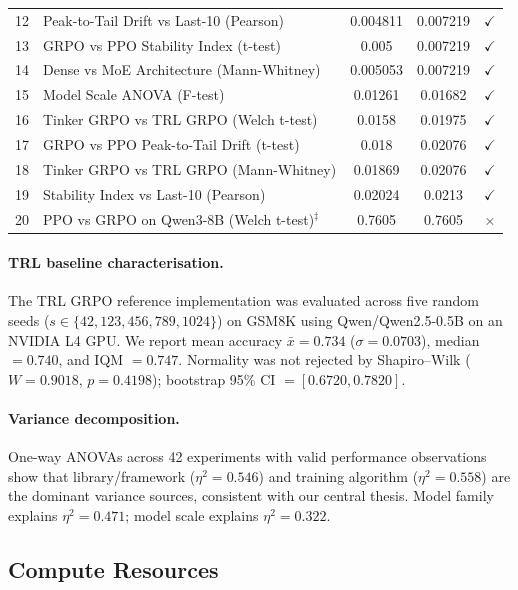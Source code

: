 \documentclass{article}  \usepackage[preprint,nonatbib]{neurips_2026} \usepackage[numbers]{natbib}
\begin{document}
\begin{table}[!ht]
\begin{tabular}{@{}rp{6.2cm}ccc@{}}
        12 & Peak-to-Tail Drift vs Last-10 (Pearson) & 0.004811 & 0.007219 & $\checkmark$ \\
        13 & GRPO vs PPO Stability Index (t-test) & 0.005 & 0.007219 & $\checkmark$ \\
        14 & Dense vs MoE Architecture (Mann-Whitney) & 0.005053 & 0.007219 & $\checkmark$ \\
        15 & Model Scale ANOVA (F-test) & 0.01261 & 0.01682 & $\checkmark$ \\
        16 & Tinker GRPO vs TRL GRPO (Welch t-test) & 0.0158 & 0.01975 & $\checkmark$ \\
        17 & GRPO vs PPO Peak-to-Tail Drift (t-test) & 0.018 & 0.02076 & $\checkmark$ \\
        18 & Tinker GRPO vs TRL GRPO (Mann-Whitney) & 0.01869 & 0.02076 & $\checkmark$ \\
        19 & Stability Index vs Last-10 (Pearson) & 0.02024 & 0.0213 & $\checkmark$ \\
        20 & PPO vs GRPO on Qwen3-8B (Welch t-test)$^{\ddag}$ & 0.7605 & 0.7605 & $\times$ \\
\bottomrule
\end{tabular}
\end{table}

\paragraph{TRL baseline characterisation.}
The TRL GRPO reference implementation was evaluated across five random seeds
($s \in \{42, 123, 456, 789, 1024\}$) on GSM8K using Qwen/Qwen2.5-0.5B on
an NVIDIA L4 GPU. We report mean accuracy $\bar{x} = 0.734$ ($\sigma = 0.0703$),
median $= 0.740$, and IQM $= 0.747$. Normality was not rejected by Shapiro--Wilk
($W = 0.9018$, $p = 0.4198$); bootstrap 95\% CI $= [0.6720, 0.7820]$.

\paragraph{Variance decomposition.}
One-way ANOVAs across 42 experiments with valid performance observations show
that library/framework ($\eta^2 = 0.546$) and training algorithm ($\eta^2 = 0.558$)
are the dominant variance sources, consistent with our central thesis. Model
family explains $\eta^2 = 0.471$; model scale explains $\eta^2 = 0.322$.

\subsection{Compute Resources}
\end{document}
